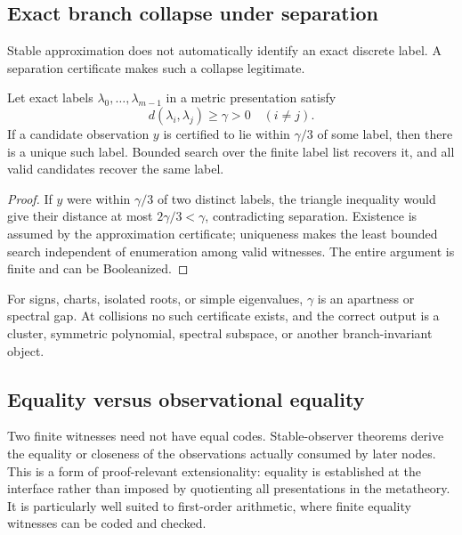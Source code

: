 \subsection{Exact branch collapse under separation}

Stable approximation does not automatically identify an exact discrete label.  A
separation certificate makes such a collapse legitimate.

\begin{theorem}
\label{thm:gap-collapse}
Let exact labels \(\lambda_0,\ldots,\lambda_{m-1}\) in a metric presentation satisfy
\[
   d(\lambda_i,\lambda_j)\ge\gamma>0
   \quad(i\ne j).
\]
If a candidate observation \(y\) is certified to lie within \(\gamma/3\) of some label,
then there is a unique such label.  Bounded search over the finite label list recovers
it, and all valid candidates recover the same label.
\end{theorem}

\begin{proof}
If \(y\) were within \(\gamma/3\) of two distinct labels, the triangle inequality
would give their distance at most \(2\gamma/3<\gamma\), contradicting separation.
Existence is assumed by the approximation certificate; uniqueness makes the least
bounded search independent of enumeration among valid witnesses.  The entire argument
is finite and can be Booleanized.
\end{proof}

For signs, charts, isolated roots, or simple eigenvalues, \(\gamma\) is an apartness or
spectral gap.  At collisions no such certificate exists, and the correct output is a
cluster, symmetric polynomial, spectral subspace, or another branch-invariant object.

\subsection{Equality versus observational equality}

Two finite witnesses need not have equal codes.  Stable-observer theorems derive the
equality or closeness of the observations actually consumed by later nodes.  This is a
form of proof-relevant extensionality: equality is established at the interface rather
than imposed by quotienting all presentations in the metatheory.  It is particularly
well suited to first-order arithmetic, where finite equality witnesses can be coded and
checked.
